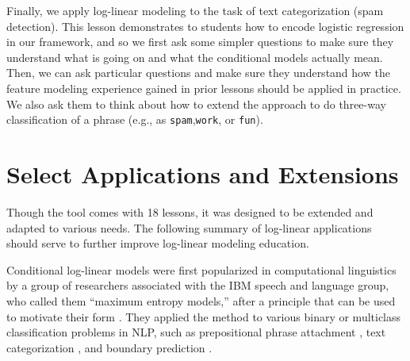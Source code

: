 \documentclass[11pt,letterpaper]{article}
\newcommand{\Note}[1]{}
\renewcommand{\Note}[1]{\hl{[#1]}}  %
\newcommand{\NoteSigned}[3]{{\sethlcolor{#2}\Note{#1: #3}}}
\newcommand{\NoteFF}[1]{\NoteSigned{FF}{LightBlue}{#1}}
\newcommand{\NumLessons}[0]{18}%
\begin{document}
Finally, we apply log-linear modeling to the task of text categorization (spam detection). This lesson demonstrates to students how to encode logistic regression in our framework, and so 
we first ask some simpler questions to make sure they understand what is going on and what the conditional models actually mean.
Then, we can ask particular questions and make sure they understand how the feature modeling experience gained in 
prior lessons should be applied in practice. We also ask them to think about how to extend the approach to do three-way classification 
of a phrase (e.g., as \texttt{spam},\texttt{work}, or \texttt{fun}).



\section{Select Applications and Extensions} \label{sec:history}
Though the tool comes with \NumLessons{} lessons, it was designed to be extended 
and adapted to various needs. The following summary of log-linear applications should 
serve to further improve log-linear modeling education.

Conditional log-linear models were first popularized in computational
linguistics by a group of researchers associated with the IBM speech
and language group, who called them ``maximum entropy models,'' after
a principle that can be used to motivate their form
\cite{jaynes-1957}.  They applied the method to various binary or
multiclass classification problems in NLP, such as prepositional
phrase attachment \cite{ratnaparkhi-1994}, text categorization
\cite{nigam-lafferty-mccallum-1999}, and boundary prediction
\cite{beeferman-berger-lafferty-1999}.
\end{document}
